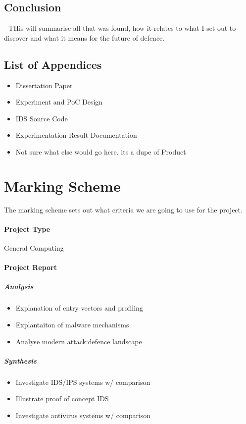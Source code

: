 \subsection{Conclusion} - THis will summarise all that was found, how it relates to what I set out to discover and what it means for the future of defence. 

\subsection{List of Appendices}
\begin{itemize}
	\item Dissertation Paper
	\item Experiment and PoC Design
	\item IDS Source Code
	\item Experimentation Result Documentation
	\item Not sure what else would go here. its a dupe of Product
\end{itemize}

\section{Marking Scheme}
The marking scheme sets out what criteria we are going to use for the project.

\paragraph{Project Type} General Computing

\paragraph{Project Report}
\subparagraph{Analysis}
\begin{itemize}
	\item Explanation of entry vectors and profiling
	\item Explantaiton of malware mechanisms
	\item Analyse modern attack:defence landscape
\end{itemize}

\subparagraph{Synthesis}
\begin{itemize}
	\item Investigate IDS/IPS systems w/ comparison
	\item Illustrate proof of concept IDS
	\item Investigate antivirus systems w/ comparison
\end{itemize}


